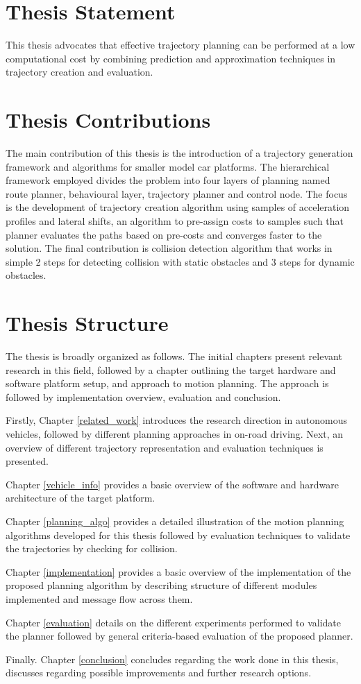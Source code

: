 \section{Thesis Statement}

This thesis advocates that effective trajectory planning can be performed at a low computational cost by combining prediction and approximation techniques in trajectory creation and evaluation.

\section{Thesis Contributions}

The main contribution of this thesis is the introduction of a trajectory generation framework and algorithms for smaller model car platforms. The hierarchical framework employed divides the problem into four layers of planning named route planner, behavioural layer, trajectory planner and control node. The focus is the development of trajectory creation algorithm using samples of acceleration profiles and lateral shifts, an algorithm to pre-assign costs to samples such that planner evaluates the paths based on pre-costs and converges faster to the solution. The final contribution is collision detection algorithm that works in simple 2 steps for detecting collision with static obstacles and 3 steps for dynamic obstacles. 

\section{Thesis Structure}


The thesis is broadly organized as follows. The initial chapters present relevant research in this field, followed by a chapter outlining the target hardware and software platform setup, and approach to motion planning. The approach is followed by implementation overview, evaluation and conclusion.

Firstly, Chapter \ref{related_work} introduces the research direction in autonomous vehicles, followed by different planning approaches in on-road driving. Next, an overview of different trajectory representation and evaluation techniques is presented.

Chapter \ref{vehicle_info} provides a basic overview of the software and hardware architecture of the target platform.

Chapter \ref{planning_algo} provides a detailed illustration of the motion planning algorithms developed for this thesis followed by evaluation techniques to validate the trajectories by checking for collision.

Chapter \ref{implementation} provides a basic overview of the implementation of the proposed planning algorithm by describing structure of different modules implemented and message flow across them.

Chapter \ref{evaluation} details on the different experiments performed to validate the planner followed by general criteria-based evaluation of the proposed planner.

Finally. Chapter \ref{conclusion} concludes regarding the work done in this thesis, discusses regarding possible improvements and further research options.
